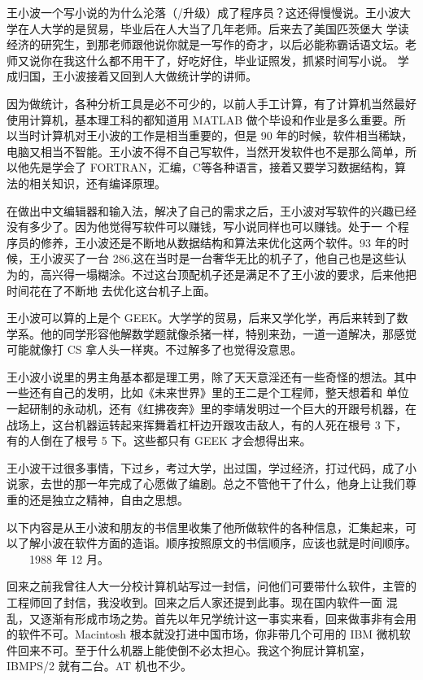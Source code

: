 王小波一个写小说的为什么沦落（/升级）成了程序员？这还得慢慢说。王小波大学在人大学的是贸易，毕业后在人大当了几年老师。后来去了美国匹茨堡大 学读经济的研究生，到那老师跟他说你就是一写作的奇才，以后必能称霸话语文坛。老师又说你在我这什么都不用干了，好吃好住，毕业证照发，抓紧时间写小说。 学成归国，王小波接着又回到人大做统计学的讲师。

因为做统计，各种分析工具是必不可少的，以前人手工计算，有了计算机当然最好使用计算机，基本理工科的都知道用 MATLAB 做个毕设和作业是多么重要。所以当时计算机对王小波的工作是相当重要的，但是 90 年的时候，软件相当稀缺，电脑又相当不智能。王小波不得不自己写软件，当然开发软件也不是那么简单，所以他先是学会了 FORTRAN，汇编，C等各种语言，接着又要学习数据结构，算法的相关知识，还有编译原理。

在做出中文编辑器和输入法，解决了自己的需求之后，王小波对写软件的兴趣已经没有多少了。因为他觉得写软件可以赚钱，写小说同样也可以赚钱。处于一 个程序员的修养，王小波还是不断地从数据结构和算法来优化这两个软件。93 年的时候，王小波买了一台 286,这在当时是一台奢华无比的机子了，他自己也是这些认为的，高兴得一塌糊涂。不过这台顶配机子还是满足不了王小波的要求，后来他把时间花在了不断地 去优化这台机子上面。

王小波可以算的上是个 GEEK。大学学的贸易，后来又学化学，再后来转到了数学系。他的同学形容他解数学题就像杀猪一样，特别来劲，一道一道解决，那感觉可能就像打 CS 拿人头一样爽。不过解多了也觉得没意思。

王小波小说里的男主角基本都是理工男，除了天天意淫还有一些奇怪的想法。其中一些还有自己的发明，比如《未来世界》里的王二是个工程师，整天想着和 单位一起研制的永动机，还有《红拂夜奔》里的李靖发明过一个巨大的开跟号机器，在战场上，这台机器运转起来挥舞着杠杆边开跟攻击敌人，有的人死在根号 3 下，有的人倒在了根号 5 下。这些都只有 GEEK 才会想得出来。

王小波干过很多事情，下过乡，考过大学，出过国，学过经济，打过代码，成了小说家，去世的那一年完成了心愿做了编剧。总之不管他干了什么，他身上让我们尊重的还是独立之精神，自由之思想。

以下内容是从王小波和朋友的书信里收集了他所做软件的各种信息，汇集起来，可以了解小波在软件方面的造诣。顺序按照原文的书信顺序，应该也就是时间顺序。
　　1988 年 12 月。

回来之前我曾往人大一分校计算机站写过一封信，问他们可要带什么软件，主管的工程师回了封信，我没收到。回来之后人家还提到此事。现在国内软件一面 混乱，又逐渐有形成市场之势。首先以年兄学统计这一事实来看，回来做事非有会用的软件不可。Macintosh 根本就没打进中国市场，你非带几个可用的 IBM 微机软件回来不可。至于什么机器上能使倒不必太担心。我这个狗屁计算机室，IBMPS/2 就有二台。AT 机也不少。

